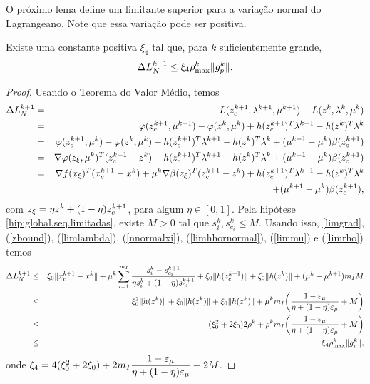 O próximo lema define um limitante superior para a variação normal do
Lagrangeano. Note que essa variação pode ser positiva.
\begin{lemma} 
  Existe uma constante positiva $\xi_4$ tal que, para $k$ suficientemente
  grande,
  $$\Delta L_N^{k+1} \leq \xi_4\rho_{\max}^k\Vert g_p^{k}\Vert.  $$ 
\end{lemma} 
\begin{proof}
    Usando o Teorema do Valor Médio, temos
\begin{eqnarray*} 
    \Delta L_N^{k+1} & = & L(z_c^{k+1},\lambda^{k+1},\mu^{k+1}) - L(z^k,\lambda^{k},\mu^k) \\ 
    & = & \varphi(z_c^{k+1},\mu^{k+1}) - \varphi(z^k,\mu^k) + h(z_c^{k+1})^T\lambda^{k+1} -
      h(z^k)^T\lambda^{k} \\ 
    & = & \varphi(z_c^{k+1},\mu^k) - \varphi(z^k,\mu^k) + h(z_c^{k+1})^T\lambda^{k+1} -
      h(z^k)^T\lambda^{k} + (\mu^{k+1}-\mu^k)\beta(z_c^{k+1}) \\
    & = & \nabla \varphi (z_{\xi},\mu^k)^T(z_c^{k+1}-z^k) + h(z_c^{k+1})^T\lambda^{k+1} -
      h(z^k)^T\lambda^{k} + (\mu^{k+1}-\mu^k)\beta(z_c^{k+1}) \\
    & =  & \nabla f(x_{\xi})^T(x_c^{k+1}-x^k) +
      \mu^k\nabla\beta(z_{\xi})^T(z_c^{k+1}-z^k) + h(z_c^{k+1})^T\lambda^{k+1} -
      h(z^k)^T\lambda^{k} \\
    & & + (\mu^{k+1}-\mu^k)\beta(z_c^{k+1}),
\end{eqnarray*} 
  com $z_{\xi} = \eta z^k + (1-\eta)z_c^{k+1}$, para algum $\eta \in [0,1]$. 
  Pela hipótese \ref{hip:global.seq.limitadas}, existe $M >
  0$ tal que $s_i^k,s_{c_i}^k \leq M$. Usando isso, \eqref{limgrad},
(\ref{zbound}), (\ref{limlambda}), (\ref{nnormalxi}), (\ref{limhhornormal}), (\ref{limmu}) e
(\ref{limrho}) temos 
\begin{eqnarray*} 
  \Delta L_N^{k+1} & \leq & \xi_0\Vert x_c^{k+1}-x^k\Vert + 
  \mu^k\sum_{i=1}^{m_I} \frac{s_i^k - s_{c_i}^{k+1}}{\eta s_i^k +
    (1-\eta)s_{c_i}^{k+1}} + 
    \xi_0\Vert h(z_c^{k+1})\Vert + \xi_0\Vert h(z^k)\Vert + (\mu^k - \mu^{k+1})m_IM \\ 
  & \leq & \xi_0^2\Vert h(z^k)\Vert + \xi_0\Vert h(z^k)\Vert + \xi_0\Vert h(z^k)\Vert +
    \mu^km_I\bigg(\frac{1 - \varepsilon_{\mu}}{\eta + (1-\eta)\varepsilon_{\mu}}+M\bigg) \\ 
  & \leq & (\xi_0^2 + 2\xi_0)2\rho^k + 
    \rho^km_I\bigg(\frac{1 - \varepsilon_{\mu}}{\eta + (1-\eta)\varepsilon_{\mu}}+M\bigg) \\ 
  & \leq & \xi_4\rho_{\max}^k\Vert g_p^{k}\Vert, 
\end{eqnarray*}
onde $\xi_4 = 4(\xi_0^2 + 2\xi_0) + 2m_I\dfrac{1-\varepsilon_{\mu}}{\eta+(1-\eta)\varepsilon_{\mu}}+2M$.  
\end{proof}

